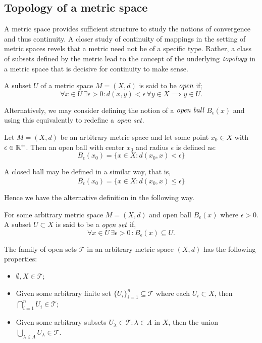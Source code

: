 \subsection{Topology of a metric space}

A metric space provides sufficient structure to study the notions of
convergence and thus continuity. A closer study of continuity of mappings
in the setting of metric spaces revels that a metric need not be of a
specific type. Rather, a class of subsets defined by the metric lead to
the concept of the underlying $\emph{topology}$ in a metric space that is
decisive for continuity to make sense.

\begin{defn}
	A subset $U$ of a metric space $M=(X,d)$ is said to be $\emph{open}$ if;
	\[
		\forall x \in U \, \exists \epsilon > 0 : d(x,y)
		< \epsilon \, \forall y \in X \implies y \in U.
	\]
\end{defn}

Alternatively, we may consider defining the notion of a
$\emph{open ball}$ $B_{\epsilon}(x)$ and using this
equivalently to redefine a $\emph{open set}$.

\begin{defn}
	Let $M=(X,d)$ be an arbitrary metric space and let some point
	$x_0 \in X$ with $\epsilon \in \mathbb{R}^{+}$. Then an open ball
	with center $x_0$ and radius $\epsilon$ is defined as:
	\[
		B_{\epsilon}(x_0) = \{ x \in X : d(x_0,x) < \epsilon \}
	\]
\end{defn}

\begin{rem}
	A closed ball may be defined in a similar way, that is,
	\[
		\bar{B_{\epsilon}}(x_0) = \{ x \in X : d(x_0,x) \leq \epsilon \}
	\]
\end{rem}

Hence we have the alternative definition in the following way.

\begin{defn}
	For some arbitrary metric space $M=(X,d)$ and open ball $B_{\epsilon}(x)$
	where $\epsilon>0$. A subset $U \subset X$ is said to be a $\emph{open set}$ if,
	\[
		\forall x \in U \, \exists \epsilon >0 \, : B_{\epsilon}(x) \subseteq U.
	\]
\end{defn}

\begin{thm}
	The family of open sets $\mathcal{T}$ in an arbitrary metric space
	$(X,d)$ has the following properties:
	\begin{itemize}
		\item $\emptyset , X \in \mathcal{T}$;
		\item Given some arbitrary finite set $\{U_i\}_{i=1}^{n} \subseteq \mathcal{T}$
			where each $U_i \subset X$, then
			$\displaystyle \bigcap_{i=1}^{n} U_i \in \mathcal{T}$;
		\item Given some arbitrary subsets
			$U_{\lambda} \in \mathcal{T} : \lambda \in \Lambda$ in $X$, then
			the union $\displaystyle \bigcup_{\lambda \in \Lambda} U_{\lambda} \in \mathcal{T}$.
	\end{itemize}
\end{thm}

